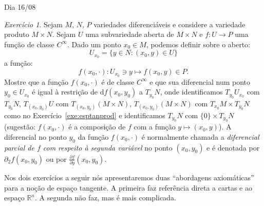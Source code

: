 \documentclass[oneside,11pt]{amsart}
\newcommand{\R}{\mathds R}
\newcommand{\dd}{\mathrm d}
\theoremstyle{remark}\newtheorem{exercise}{Exercício}[section]
\theoremstyle{plain}\newtheorem{teo}{Teorema}[section]
\theoremstyle{plain}\newtheorem{lem}[teo]{Lema}
\theoremstyle{plain}\newtheorem{prop}[teo]{Proposição}
\theoremstyle{definition}\newtheorem{defin}[teo]{Definição}
\theoremstyle{remark}\newtheorem{rem}[teo]{Observação}
\theoremstyle{definition}\newtheorem{example}[teo]{Exemplo}
\numberwithin{equation}{section}
\begin{document}
\begin{section}{Dia 16/08}
\begin{exercise}\label{exe:difparcial}
Sejam $M$, $N$, $P$ variedades diferenciáveis e considere a variedade produto $M\times N$. Sejam $U$ uma subvariedade aberta de $M\times N$
e $f:U\to P$ uma função de classe $C^\infty$. Dado um ponto $x_0\in M$, podemos definir sobre o aberto:
\[U_{x_0}=\big\{y\in N:(x_0,y)\in U\big\}\]
a função:
\[f(x_0,\cdot):U_{x_0}\ni y\longmapsto f(x_0,y)\in P.\]
Mostre que a função $f(x_0,\cdot)$ é de classe $C^\infty$ e que sua diferencial num ponto $y_0\in U_{x_0}$ é igual à restrição
de $\dd f(x_0,y_0)$ a $T_{y_0}N$, onde identificamos $T_{y_0}U_{x_0}$ com $T_{y_0}N$, $T_{(x_0,y_0)}U$ com $T_{(x_0,y_0)}(M\times N)$, $T_{(x_0,y_0)}(M\times N)$ com
$T_{x_0}M\times T_{y_0}N$ como no Exercício~\ref{exe:esptanprod} e identificamos $T_{y_0}N$ com $\{0\}\times T_{y_0}N$ (sugestão:
$f(x_0,\cdot)$ é a composição de $f$ com a função $y\mapsto(x_0,y)$). A diferencial no ponto $y_0$ da função $f(x_0,\cdot)$ é normalmente
chamada a {\em diferencial parcial de $f$ com respeito à segunda variável\/} no ponto $(x_0,y_0)$ e é denotada por $\partial_2f(x_0,y_0)$
ou por $\frac{\partial f}{\partial y}(x_0,y_0)$.
\end{exercise}

Nos dois exercícios a seguir nós apresentaremos duas ``abordagens a\-xi\-o\-má\-ti\-cas'' para a noção de espaço tangente.
A primeira faz referência direta a cartas e ao espaço $\R^n$. A segunda não faz, mas é mais complicada.


\end{section}
\end{document}
